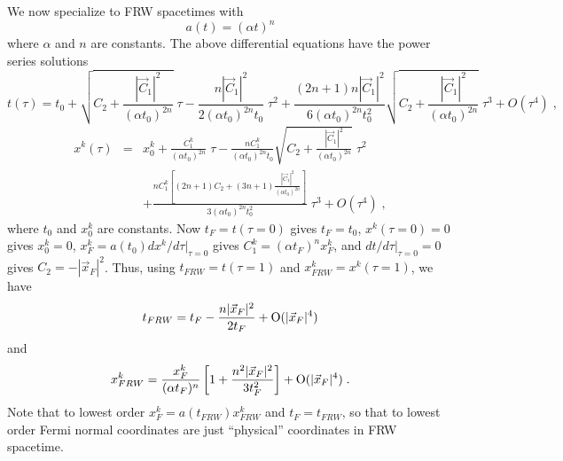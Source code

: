 We now specialize to FRW spacetimes with 
\begin{equation} 
a(t)=(\alpha t)^n 
\end{equation} 
where $\alpha$ and $n$ are constants. The above
differential equations have the power series solutions 
\begin{equation}
t(\tau)=t_0+\sqrt{C_2+\frac{|\vec{C}_1|^2}{(\alpha t_0)^{2n}}}\;\tau
-\frac{n|\vec{C}_1|^2}{2 ( \alpha
t_0)^{2n}t_0}\;\tau^2+\frac{(2n+1)n|\vec{C}_1|^2} {6 (\alpha
t_0)^{2n}t_0^2}\sqrt{C_2+\frac{|\vec{C}_1|^2}{(\alpha t_0)^{2n}}}\;\tau^3
+O(\tau^4) \; , 
\end{equation} 
\begin{eqnarray} x^k(\tau) & = &
x^k_0+\frac{C_1^k}{(\alpha t_0)^{2n}}\;\tau -\frac{n C_1^k}{(\alpha t_0)^
{2n}t_0}\sqrt{C_2+\frac{|\vec{C}_1|^2}{(\alpha t_0)^{2n}}}\;\tau^2
\nonumber \\ & & +\frac{
n C_1^k \left[(2n+1)C_2+(3n+1)\frac{|\vec{C}_1|^2}{(\alpha
t_0)^{2n}}\right]} {3(\alpha t_0)^{2n}t_0^2} \;\tau^3+O(\tau^4) \; ,
\end{eqnarray} 
where $t_0$ and $x_0^k$ are constants. Now $t_F=t(\tau=0)$
gives $t_F=t_0$, $x^k(\tau=0)=0$ gives $x_0^k=0$,
$x_F^k=a(t_0)dx^k/d\tau|_{\tau=0}$ gives $C_1^k=(\alpha t_F)^nx_F^k$, and
$dt/d\tau|_{\tau=0}=0$ gives $C_2=-|\vec{x}_F|^2$.  Thus, using
$t_{FRW}=t(\tau=1)$ and $x^k_{FRW}=x^k(\tau=1)$, we have 
\begin{equation}
t_{FRW}=t_F-\frac{n|\vec{x}_F|^2}{2t_F}+{\mbox O} (|\vec{x}_F|^4) 
\end{equation} 
and 
\begin{equation} 
x^k_{FRW}=\frac{x_F^k}{(\alpha
t_F)^n}   \left[ 1+\frac{n^2|\vec{x}_F|^2}{3 t_F^2}\right] +{\mbox
O}(|\vec{x}_F|^4) \; .  
\end{equation} 
Note that to lowest order
$x_F^k=a(t_{FRW})x^k_{FRW}$ and $t_F=t_{FRW}$, so that to lowest order
Fermi normal coordinates are just ``physical'' coordinates in FRW
spacetime. 
  

